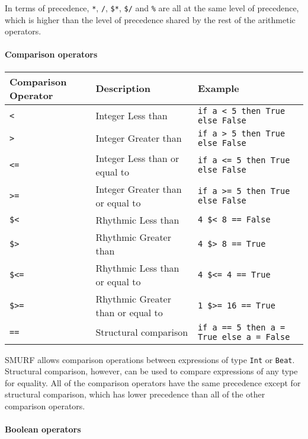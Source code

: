In terms of precedence, \texttt{*}, \texttt{/}, \texttt{\$*}, \texttt{\$/} and \texttt{\%} are all at the same
level of precedence, which is higher than the level of precedence shared by the rest of the arithmetic operators.

\paragraph{Comparison operators}

\begin{table} [H]
\centering
\begin{tabularx}{\textwidth}{XlX}
\hline\hline
Comparison Operator & Description & Example \\
\hline\hline
  \texttt{<}  & Integer Less than & \texttt{if a < 5 then True else False} \\ \hline
  \texttt{>}  & Integer Greater than & \texttt{if a > 5 then True else False}  \\ \hline
  \texttt{<=}  & Integer Less than or equal to & \texttt{if a <= 5 then True else False} \\ \hline
  \texttt{>=} & Integer Greater than or equal to & \texttt{if a >= 5 then True else False} \\ \hline
  \texttt{\$<} & Rhythmic Less than & \texttt{4 \$< 8 == False} \\ \hline
  \texttt{\$>}  & Rhythmic Greater than &  \texttt{4 \$> 8 == True}  \\ \hline
  \texttt{\$<=} & Rhythmic Less than or equal to & \texttt{4 \$<= 4 == True} \\ \hline
  \texttt{\$>=} & Rhythmic Greater than or equal to &  \texttt{1 \$>= 16 == True} \\ \hline
  \texttt{==} & Structural comparison & \texttt{if a == 5 then a = True else a = False} \\ \hline
\end{tabularx}
\end{table}

SMURF allows comparison operations between expressions of type \texttt{Int} or \texttt{Beat}.
Structural comparison, however, can be used to compare expressions of any type for equality.
All of the comparison operators have the same precedence except for structural comparison, which
has lower precedence than all of the other comparison operators.

\paragraph{Boolean operators}


